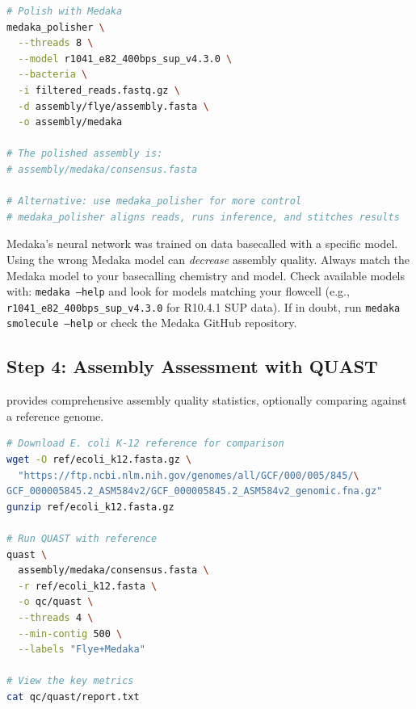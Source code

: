 \begin{lstlisting}[language=bash,caption={Polishing the assembly with Medaka.},label=lst:diy-medaka]
# Polish with Medaka
medaka_polisher \
  --threads 8 \
  --model r1041_e82_400bps_sup_v4.3.0 \
  --bacteria \
  -i filtered_reads.fastq.gz \
  -d assembly/flye/assembly.fasta \
  -o assembly/medaka

# The polished assembly is:
# assembly/medaka/consensus.fasta

# Alternative: use medaka_polisher for more control
# medaka_polisher aligns reads, runs inference, and stitches results
\end{lstlisting}

\begin{warningbox}[title={Medaka Model Must Match Basecalling Model}]
Medaka's neural network was trained on data basecalled with a specific model. Using the wrong Medaka model can \emph{decrease} assembly quality. Always match the Medaka model to your basecalling chemistry and model. Check available models with: \texttt{medaka --help} and look for models matching your flowcell (e.g., \texttt{r1041\_e82\_400bps\_sup\_v4.3.0} for R10.4.1 SUP data). If in doubt, run \texttt{medaka smolecule --help} or check the Medaka GitHub repository.
\end{warningbox}

\subsection{Step 4: Assembly Assessment with QUAST}
\label{subsec:diyanalysis:quast}

\software{QUAST} provides comprehensive assembly quality statistics, optionally comparing against a reference genome.

\begin{lstlisting}[language=bash,caption={Assessing assembly quality with QUAST.},label=lst:diy-quast]
# Download E. coli K-12 reference for comparison
wget -O ref/ecoli_k12.fasta.gz \
  "https://ftp.ncbi.nlm.nih.gov/genomes/all/GCF/000/005/845/\
GCF_000005845.2_ASM584v2/GCF_000005845.2_ASM584v2_genomic.fna.gz"
gunzip ref/ecoli_k12.fasta.gz

# Run QUAST with reference
quast \
  assembly/medaka/consensus.fasta \
  -r ref/ecoli_k12.fasta \
  -o qc/quast \
  --threads 4 \
  --min-contig 500 \
  --labels "Flye+Medaka"

# View the key metrics
cat qc/quast/report.txt
\end{lstlisting}

